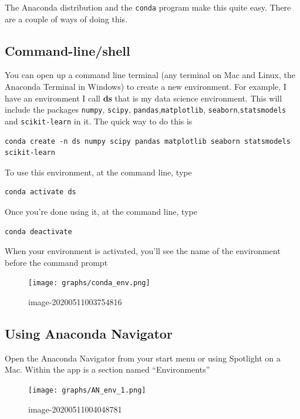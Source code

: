 \documentclass[
  letterpaper,
]{scrbook}
\begin{document}
The Anaconda distribution and the \texttt{conda} program make this quite easy. There are a couple of ways of doing this.

\hypertarget{command-lineshell}{%
\subsection{Command-line/shell}\label{command-lineshell}}

You can open up a command line terminal (any terminal on Mac and Linux, the Anaconda Terminal in Windows) to create a new environment. For example, I have an environment I call \textbf{ds} that is my data science environment. This will include the packages \texttt{numpy}, \texttt{scipy}, \texttt{pandas},\texttt{matplotlib}, \texttt{seaborn},\texttt{statsmodels} and \texttt{scikit-learn} in it. The quick way to do this is

\begin{verbatim}
conda create -n ds numpy scipy pandas matplotlib seaborn statsmodels scikit-learn
\end{verbatim}

To use this environment, at the command line, type

\begin{verbatim}
conda activate ds
\end{verbatim}

Once you're done using it, at the command line, type

\begin{verbatim}
conda deactivate
\end{verbatim}

When your environment is activated, you'll see the name of the environment before the command prompt

\begin{figure}
\centering
\texttt{[image: graphs/conda\_env.png]}
\caption{image-20200511003754816}
\end{figure}

\hypertarget{using-anaconda-navigator}{%
\subsection{Using Anaconda Navigator}\label{using-anaconda-navigator}}

Open the Anaconda Navigator from your start menu or using Spotlight on a Mac. Within the app is a section named ``Environments''

\begin{figure}
\centering
\texttt{[image: graphs/AN\_env\_1.png]}
\caption{image-20200511004048781}
\end{figure}
\end{document}
